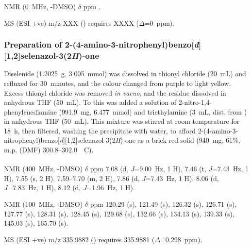 \begin{refsection}
 NMR (0~MHz, -DMSO) $\delta$ ppm
.

MS (ESI +ve) m/z XXX ()  requires XXXX ($\Delta$=0~ppm).

\normalsize


\subsubsection[Preparation of \refcmpd{ebs-3no2-4nh2}]{Preparation of 2-(4-amino-3-nitrophenyl)benzo[\emph{d}][1,2]selenazol-3(2\emph{H})-one }
Diselenide  (1.2025~g, 3.005~mmol) was dissolved in thionyl chloride (20~mL) and refluxed for 30~minutes, and the colour changed from purple to light yellow.
Excess thionyl chloride was removed \emph{in vacuo}, and the residue dissolved in anhydrous THF (50~mL).
To this was added a solution of 2-nitro-1,4-phenylenediamine (991.9~mg, 6.477~mmol) and triethylamine (3~mL, dist. from ) in anhydrous THF (50~mL).
This mixture was stirred at room temperature for 18~h, then filtered, washing the precipitate with water, to afford 2-(4-amino-3-nitrophenyl)benzo[\emph{d}][1,2]selenazol-3(2\emph{H})-one  as a brick red solid (940~mg, 61\%, m.p. (DMF) 300.8--302.0~\degree~C).

\footnotesize\paragraph{}

 NMR (400~MHz, -DMSO) $\delta$ ppm
7.08 (d, \emph{J}=9.00~Hz, 1 H),
7.46 (t, \emph{J}=7.43~Hz, 1 H),
7.55 (s, 2 H),
7.59--7.70 (m, 2 H),
7.86 (d, \emph{J}=7.43~Hz, 1 H),
8.06 (d, \emph{J}=7.83~Hz, 1 H),
8.12 (d, \emph{J}=1.96~Hz, 1 H).

 NMR (100~MHz, -DMSO) $\delta$ ppm
120.29 (s),
121.49 (s),
126.32 (s),
126.71 (s),
127.77 (s),
128.31 (s),
128.45 (s),
129.68 (s),
132.66 (s),
134.13 (s),
139.33 (s),
145.03 (s),
165.70 (s).

MS (ESI +ve) m/z 335.9882 ()  requires 335.9881 ($\Delta$=0.298~ppm).

\normalsize



\end{refsection}
